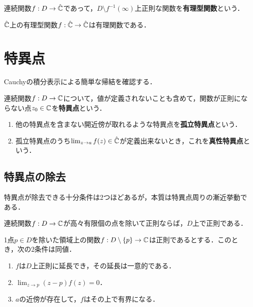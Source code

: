 \documentclass[uplatex, dvipdfmx]{jsreport}
\begin{document}
\begin{definition}
    連続関数$f:D\to\hat{\mathbb{C}}$であって，$D\setminus f^{-1}(\infty)$上正則な関数を\textbf{有理型関数}という．
\end{definition}

\begin{theorem}
    $\hat{\mathbb{C}}$上の有理型関数$f:\hat{\mathbb{C}}\to\hat{\mathbb{C}}$は有理関数である．
\end{theorem}

\section{特異点}

\begin{tcolorbox}[colframe=ForestGreen, colback=ForestGreen!10!white,breakable,colbacktitle=ForestGreen!40!white,coltitle=black,fonttitle=\bfseries\sffamily,
title=]
    Cauchyの積分表示による簡単な帰結を確認する．
\end{tcolorbox}

\begin{definition}
    連続関数$f:D\to\mathbb{C}$について，値が定義されないことも含めて，関数が正則にならない点$z_0\in\mathbb{C}$を\textbf{特異点}という．
    \begin{enumerate}
        \item 他の特異点を含まない開近傍が取れるような特異点を\textbf{孤立特異点}という．
        \item 孤立特異点のうち$\lim_{z\to a}f(z)\in\hat{\mathbb{C}}$が定義出来ないとき，これを\textbf{真性特異点}という．
    \end{enumerate}
\end{definition}

\subsection{特異点の除去}

\begin{tcolorbox}[colframe=ForestGreen, colback=ForestGreen!10!white,breakable,colbacktitle=ForestGreen!40!white,coltitle=black,fonttitle=\bfseries\sffamily,
title=]
    特異点が除去できる十分条件は2つほどあるが，本質は特異点周りの漸近挙動である．
\end{tcolorbox}

\begin{corollary}[連続性による除去]
    連続関数$f:D\to\mathbb{C}$が高々有限個の点を除いて正則ならば，$D$上で正則である．
\end{corollary}

\begin{corollary}
    1点$p\in D$を除いた領域上の関数$f:D\setminus\{p\}\to\mathbb{C}$は正則であるとする．このとき，次の2条件は同値．
    \begin{enumerate}
        \item $f$は$D$上正則に延長でき，その延長は一意的である．
        \item $\lim_{z\to p}(z-p)f(z)=0$．
        \item $a$の近傍が存在して，$f$はその上で有界になる．
    \end{enumerate}
\end{corollary}
\end{document}

